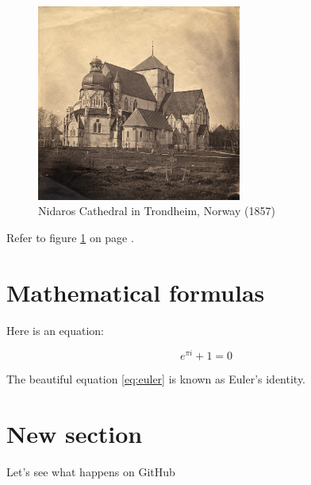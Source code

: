 \documentclass{article}
\begin{document}
\begin{figure}[htbp] %
    \centering %
    \includegraphics[width=0.6\textwidth]{images/Nidarosdom_1857.jpg}
    \caption{Nidaros Cathedral in Trondheim, Norway (1857)}
    \label{fig:nidaros}
\end{figure}

Refer to figure \ref{fig:nidaros} on page \pageref{fig:nidaros}.

\section{Mathematical formulas}

Here is an equation:

\begin{equation}
    e^{\pi i} + 1 = 0
    \label{eq:euler}
\end{equation}

The beautiful equation \ref{eq:euler} is known as Euler's identity.

\section{New section}

Let's see what happens on GitHub
\end{document}
